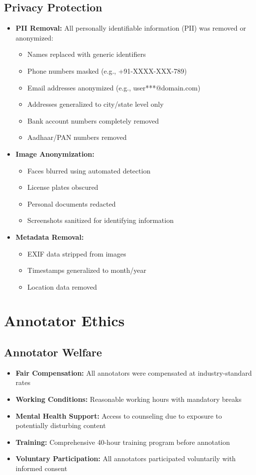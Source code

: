 \documentclass[10pt,a4paper]{article}
\begin{document}
\subsection{Privacy Protection}
\begin{itemize}[leftmargin=*]
\item \textbf{PII Removal:} All personally identifiable information (PII) was removed or anonymized:
  \begin{itemize}
  \item Names replaced with generic identifiers
  \item Phone numbers masked (e.g., +91-XXXX-XXX-789)
  \item Email addresses anonymized (e.g., user***@domain.com)
  \item Addresses generalized to city/state level only
  \item Bank account numbers completely removed
  \item Aadhaar/PAN numbers removed
  \end{itemize}
\item \textbf{Image Anonymization:}
  \begin{itemize}
  \item Faces blurred using automated detection
  \item License plates obscured
  \item Personal documents redacted
  \item Screenshots sanitized for identifying information
  \end{itemize}
\item \textbf{Metadata Removal:}
  \begin{itemize}
  \item EXIF data stripped from images
  \item Timestamps generalized to month/year
  \item Location data removed
  \end{itemize}
\end{itemize}

\section{Annotator Ethics}

\subsection{Annotator Welfare}
\begin{itemize}[leftmargin=*]
\item \textbf{Fair Compensation:} All annotators were compensated at industry-standard rates
\item \textbf{Working Conditions:} Reasonable working hours with mandatory breaks
\item \textbf{Mental Health Support:} Access to counseling due to exposure to potentially disturbing content
\item \textbf{Training:} Comprehensive 40-hour training program before annotation
\item \textbf{Voluntary Participation:} All annotators participated voluntarily with informed consent
\end{itemize}
\end{document}

